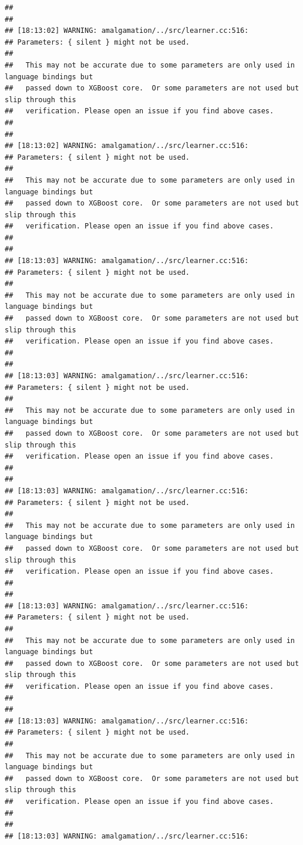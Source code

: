 \documentclass[AMS,STIX2COL]{WileyNJD-v2}\usepackage[]{graphicx}\usepackage[]{color}
\makeatletter
\newenvironment{kframe}{%
 \def\at@end@of@kframe{}%
 \ifinner\ifhmode%
  \def\at@end@of@kframe{\end{minipage}}%
  \begin{minipage}{\columnwidth}%
 \fi\fi%
 \def\FrameCommand##1{\hskip\@totalleftmargin \hskip-\fboxsep
 \colorbox{shadecolor}{##1}\hskip-\fboxsep
     \hskip-\linewidth \hskip-\@totalleftmargin \hskip\columnwidth}%
 \MakeFramed {\advance\hsize-\width
   \@totalleftmargin\z@ \linewidth\hsize
   \@setminipage}}%
 {\par\unskip\endMakeFramed%
 \at@end@of@kframe}
\newenvironment{knitrout}{}{} %
\makeatother
\begin{document}
\begin{knitrout}
\begin{kframe}
\begin{verbatim}
## 
## 
## [18:13:02] WARNING: amalgamation/../src/learner.cc:516: 
## Parameters: { silent } might not be used.
## 
##   This may not be accurate due to some parameters are only used in language bindings but
##   passed down to XGBoost core.  Or some parameters are not used but slip through this
##   verification. Please open an issue if you find above cases.
## 
## 
## [18:13:02] WARNING: amalgamation/../src/learner.cc:516: 
## Parameters: { silent } might not be used.
## 
##   This may not be accurate due to some parameters are only used in language bindings but
##   passed down to XGBoost core.  Or some parameters are not used but slip through this
##   verification. Please open an issue if you find above cases.
## 
## 
## [18:13:03] WARNING: amalgamation/../src/learner.cc:516: 
## Parameters: { silent } might not be used.
## 
##   This may not be accurate due to some parameters are only used in language bindings but
##   passed down to XGBoost core.  Or some parameters are not used but slip through this
##   verification. Please open an issue if you find above cases.
## 
## 
## [18:13:03] WARNING: amalgamation/../src/learner.cc:516: 
## Parameters: { silent } might not be used.
## 
##   This may not be accurate due to some parameters are only used in language bindings but
##   passed down to XGBoost core.  Or some parameters are not used but slip through this
##   verification. Please open an issue if you find above cases.
## 
## 
## [18:13:03] WARNING: amalgamation/../src/learner.cc:516: 
## Parameters: { silent } might not be used.
## 
##   This may not be accurate due to some parameters are only used in language bindings but
##   passed down to XGBoost core.  Or some parameters are not used but slip through this
##   verification. Please open an issue if you find above cases.
## 
## 
## [18:13:03] WARNING: amalgamation/../src/learner.cc:516: 
## Parameters: { silent } might not be used.
## 
##   This may not be accurate due to some parameters are only used in language bindings but
##   passed down to XGBoost core.  Or some parameters are not used but slip through this
##   verification. Please open an issue if you find above cases.
## 
## 
## [18:13:03] WARNING: amalgamation/../src/learner.cc:516: 
## Parameters: { silent } might not be used.
## 
##   This may not be accurate due to some parameters are only used in language bindings but
##   passed down to XGBoost core.  Or some parameters are not used but slip through this
##   verification. Please open an issue if you find above cases.
## 
## 
## [18:13:03] WARNING: amalgamation/../src/learner.cc:516: 

\end{verbatim}
\end{kframe}
\end{knitrout}
\end{document}
